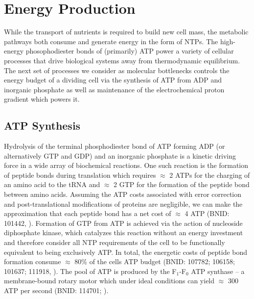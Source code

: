 \section{Energy Production}

While the transport of nutrients is required to build new cell mass, the
metabolic pathways both consume and generate energy in the form of NTPs. The
high-energy phosophodiester bonds of (primarily) ATP power a variety of
cellular processes that drive biological systems away from thermodynamic
equilibrium. The next set of processes we consider as molecular bottlenecks
controls the energy budget of a dividing cell via
the synthesis of ATP from ADP and inorganic phosphate as well as maintenance
of the electrochemical proton gradient which powers it.

\subsection{ATP Synthesis}

Hydrolysis of the terminal phosphodiester bond of ATP forming ADP (or
alternatively GTP and GDP) and an
inorganic phosphate is a kinetic driving force in a wide array of biochemical
reactions. One such reaction is the formation of peptide bonds during
translation which requires $\approx$ 2 ATPs for the charging of an amino acid
to the tRNA and $\approx$ 2 GTP for the formation of the peptide
bond between amino acids. Assuming the ATP costs associated with error
correction and post-translational modifications of proteins are negligible, we can make the
approximation that each peptide bond has a net cost of $\approx$ 4 ATP (BNID:
101442, \cite{milo2010}). Formation of GTP from ATP is achieved
via the action of nucleoside diphosphate kinase, which catalyzes this reaction
without an energy investment \citep{lascu2000} and therefore consider all NTP requirements of the
cell to be functionally equivalent to being exclusively ATP. In total, the energetic costs of peptide bond
formation consume $\approx$
80\% of the cells ATP budget (BNID: 107782; 106158; 101637; 111918,
\cite{lynch2015,stouthamer1973}). The pool of ATP is produced by
the F$_1$-F$_0$ ATP synthase -- a membrane-bound rotary motor which under ideal conditions can yield
$\approx$ 300 ATP per second (BNID: 114701; \cite{weber2003}).


